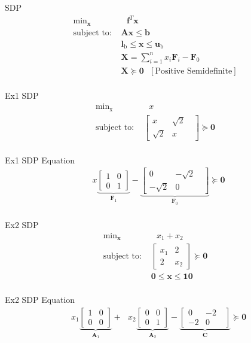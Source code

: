 \documentclass{article}
\begin{document}
SDP
\begin{align*}
    \text{min}_{\mathbf{x}}& \text{ } \mathbf{f}^T \mathbf{x} \\
    \mbox{subject to: }& \mathbf{A}\mathbf{x} \le \mathbf{b}\\
                       & \mathbf{l}_{\text{b}} \le \mathbf{x} \le \mathbf{u}_{\text{b}}\\
                       & \mathbf{X} = \sum_{i=1}^n x_i \mathbf{F}_i - \mathbf{F}_0\\
                       & \mathbf{X} \succeq \mathbf{0} \text{  } [\text{Positive Semidefinite}]\\
\end{align*}

Ex1 SDP
\begin{align*}
    \text{min}_{\text{x}}& \text{ } x\\
    \mbox{subject to: }& \left[\begin{matrix} x & \sqrt{2} \\ \sqrt{2} & x \end{matrix}\text{ }\right] \succeq \mathbf{0}\\
\end{align*}

Ex1 SDP Equation
\begin{align*}
    &x\underbrace{\begin{bmatrix} 1 & 0 \\ 0 & 1 \end{bmatrix}}_{\mathbf{F}_1} - \underbrace{\begin{bmatrix} 0 & -\sqrt{2}\text{ } \\ -\sqrt{2} & 0 \end{bmatrix}}_{\mathbf{F}_0} \succeq \mathbf{0}\\
\end{align*}

Ex2 SDP
\begin{align*}
    \text{min}_{\mathbf{x}}& \text{ } x_1 + x_2\\
    \mbox{subject to: }&\left[\begin{matrix} x_1 & 2 \\ 2 & x_2 \end{matrix}\right] \succeq \mathbf{0}\\
                       &\mathbf{0} \leq \mathbf{x} \leq \mathbf{10}\\
\end{align*}

Ex2 SDP Equation
\begin{align*}
    &x_1\underbrace{\begin{bmatrix} 1 & 0 \\ 0 & 0 \end{bmatrix}}_{\mathbf{A}_1} + \text{ } x_2\underbrace{\begin{bmatrix} 0 & 0 \\ 0 & 1 \end{bmatrix}}_{\mathbf{A}_2}
    -\underbrace{\begin{bmatrix} 0 & -2\text{ } \\ -2 & 0 \end{bmatrix}}_{\mathbf{C}} \succeq \mathbf{0}\\
\end{align*}
\end{document}
